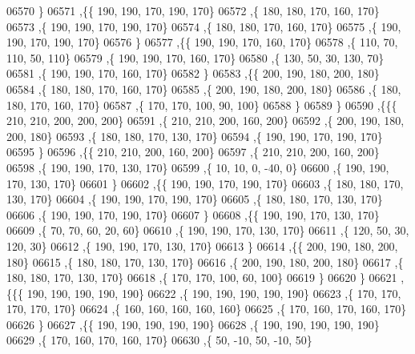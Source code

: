 \begin{DoxyCode}
06570     \}
06571    ,\{\{   190,   190,   170,   190,   170\}
06572     ,\{   180,   180,   170,   160,   170\}
06573     ,\{   190,   190,   170,   190,   170\}
06574     ,\{   180,   180,   170,   160,   170\}
06575     ,\{   190,   190,   170,   190,   170\}
06576     \}
06577    ,\{\{   190,   190,   170,   160,   170\}
06578     ,\{   110,    70,   110,    50,   110\}
06579     ,\{   190,   190,   170,   160,   170\}
06580     ,\{   130,    50,    30,   130,    70\}
06581     ,\{   190,   190,   170,   160,   170\}
06582     \}
06583    ,\{\{   200,   190,   180,   200,   180\}
06584     ,\{   180,   180,   170,   160,   170\}
06585     ,\{   200,   190,   180,   200,   180\}
06586     ,\{   180,   180,   170,   160,   170\}
06587     ,\{   170,   170,   100,    90,   100\}
06588     \}
06589    \}
06590   ,\{\{\{   210,   210,   200,   200,   200\}
06591     ,\{   210,   210,   200,   160,   200\}
06592     ,\{   200,   190,   180,   200,   180\}
06593     ,\{   180,   180,   170,   130,   170\}
06594     ,\{   190,   190,   170,   190,   170\}
06595     \}
06596    ,\{\{   210,   210,   200,   160,   200\}
06597     ,\{   210,   210,   200,   160,   200\}
06598     ,\{   190,   190,   170,   130,   170\}
06599     ,\{    10,    10,     0,   -40,     0\}
06600     ,\{   190,   190,   170,   130,   170\}
06601     \}
06602    ,\{\{   190,   190,   170,   190,   170\}
06603     ,\{   180,   180,   170,   130,   170\}
06604     ,\{   190,   190,   170,   190,   170\}
06605     ,\{   180,   180,   170,   130,   170\}
06606     ,\{   190,   190,   170,   190,   170\}
06607     \}
06608    ,\{\{   190,   190,   170,   130,   170\}
06609     ,\{    70,    70,    60,    20,    60\}
06610     ,\{   190,   190,   170,   130,   170\}
06611     ,\{   120,    50,    30,   120,    30\}
06612     ,\{   190,   190,   170,   130,   170\}
06613     \}
06614    ,\{\{   200,   190,   180,   200,   180\}
06615     ,\{   180,   180,   170,   130,   170\}
06616     ,\{   200,   190,   180,   200,   180\}
06617     ,\{   180,   180,   170,   130,   170\}
06618     ,\{   170,   170,   100,    60,   100\}
06619     \}
06620    \}
06621   ,\{\{\{   190,   190,   190,   190,   190\}
06622     ,\{   190,   190,   190,   190,   190\}
06623     ,\{   170,   170,   170,   170,   170\}
06624     ,\{   160,   160,   160,   160,   160\}
06625     ,\{   170,   160,   170,   160,   170\}
06626     \}
06627    ,\{\{   190,   190,   190,   190,   190\}
06628     ,\{   190,   190,   190,   190,   190\}
06629     ,\{   170,   160,   170,   160,   170\}
06630     ,\{    50,   -10,    50,   -10,    50\}

\end{DoxyCode}
